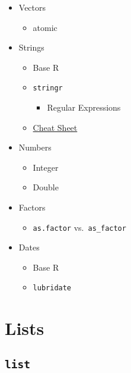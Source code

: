 \documentclass[
]{book}
\providecommand{\tightlist}{%
  \setlength{\itemsep}{0pt}\setlength{\parskip}{0pt}}
\begin{document}
\begin{itemize}
\tightlist
\item
  Vectors

  \begin{itemize}
  \tightlist
  \item
    atomic
  \end{itemize}
\item
  Strings

  \begin{itemize}
  \tightlist
  \item
    Base R
  \item
    \texttt{stringr}

    \begin{itemize}
    \tightlist
    \item
      Regular Expressions
    \end{itemize}
  \item
    \href{https://raw.githubusercontent.com/rstudio/cheatsheets/main/strings.pdf}{Cheat Sheet}
  \end{itemize}
\item
  Numbers

  \begin{itemize}
  \tightlist
  \item
    Integer
  \item
    Double
  \end{itemize}
\item
  Factors

  \begin{itemize}
  \tightlist
  \item
    \texttt{as.factor} vs.~\texttt{as\_factor}
  \end{itemize}
\item
  Dates

  \begin{itemize}
  \tightlist
  \item
    Base R
  \item
    \texttt{lubridate}
  \end{itemize}
\end{itemize}

\hypertarget{lists}{%
\chapter{Lists}\label{lists}}

\hypertarget{list}{%
\section{\texorpdfstring{\texttt{list}}{list}}\label{list}}
\end{document}
